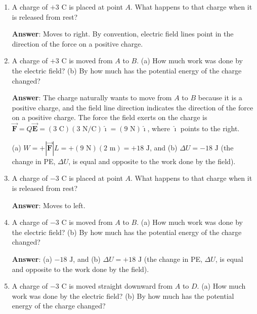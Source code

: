 \documentclass{article}
\newcommand{\ihat}[0]{\hat{\boldsymbol{\imath}}}
\newcommand{\bfvec}[1]{\vec{\mathbf{#1}}}
\begin{document}
\begin{enumerate}

  \item A charge of $+3\text{ C}$ is placed at point $A$. What happens to that charge when it is released from rest?

        \ifsolutions
        {\bf Answer}: Moves to right. By convention, electric field lines point in the direction of the force on a positive charge.
        \else

        \vskip 36pt
        \fi

  \item A charge of $+3\text{ C}$ is moved from $A$ to $B$. (a) How much work was done by the electric field? (b) By how much has the potential energy of the charge changed?

        \ifsolutions
        {\bf Answer}: The charge naturally wants to move from $A$ to $B$ because it is a positive charge, and the field line direction indicates the direction of the force on a positive charge. The force the field exerts on the charge is $\bfvec{F}=Q\bfvec{E}=(3\text{ C})(3\text { N/C})\ihat = (9\text{ N})\ihat$, where $\ihat$ points to the right.

        (a) $W=+|\bfvec{F}|L=+(9 \text{ N})(2\text { m})=+18\text{ J}$, and (b) $\Delta U = -18\text{ J}$ (the change in PE, $\Delta U$, is equal and opposite to the work done by the field).
        \else

        \vskip 36pt
        \fi

  \item A charge of $-3\text{ C}$ is placed at point $A$. What happens to that charge when it is released from rest?

        \ifsolutions
        {\bf Answer}: Moves to left.
        \else

        \vskip 48pt
        \fi

  \item A charge of $-3\text{ C}$ is moved from $A$ to $B$. (a) How much work was done by the electric field? (b) By how much has the potential energy of the charge changed?

        \ifsolutions
        {\bf Answer}: (a) $-18\text{ J}$, and (b) $\Delta U = +18\text{ J}$ (the change in PE, $\Delta U$, is equal and opposite to the work done by the field).
        \else

        \vskip 48pt
        \fi

  \item A charge of $-3\text{ C}$ is moved straight downward from $A$ to $D$. (a) How much work was done by the electric field? (b) By how much has the potential energy of the charge changed?


\end{enumerate}
\end{document}
